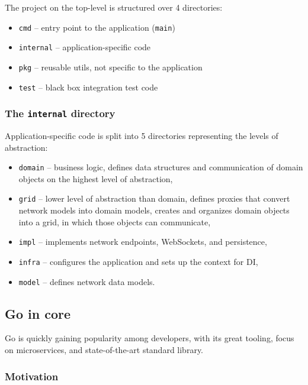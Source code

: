 The project on the top-level is structured over 4 directories:

\begin{itemize}
  \item
    \texttt{cmd} -- entry point to the application (\texttt{main})
  \item
    \texttt{internal} -- application-specific code
  \item
    \texttt{pkg} -- reusable utils, not specific to the application
  \item
    \texttt{test} -- black box integration test code
\end{itemize}

\subsubsection{\texorpdfstring{The \texttt{internal} directory}{The internal directory}}\label{the-internal-directory}

Application-specific code is split into 5 directories representing the
levels of abstraction:

\begin{itemize}
  \item
    \texttt{domain} -- business logic, defines data structures and
    communication of domain objects on the highest level of abstraction,
  \item
    \texttt{grid} -- lower level of abstraction than domain, defines
    proxies that convert network models into domain models, creates and
    organizes domain objects into a grid, in which those objects can
    communicate,
  \item
    \texttt{impl} -- implements network endpoints, WebSockets, and
    persistence,
  \item
    \texttt{infra} -- configures the application and sets up the context
    for DI,
  \item
    \texttt{model} -- defines network data models.
\end{itemize}

\subsection{Go in core}\label{go-in-core}

Go is quickly gaining popularity among developers, with its great
tooling, focus on microservices, and state-of-the-art standard library.

\subsubsection{Motivation}\label{motivation}


